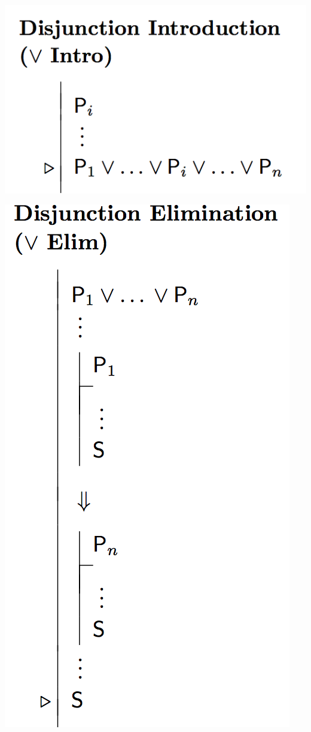\documentclass[12pt]{extarticle}
\begin{document}
\begin{multicols*}{3}
\begin{center}
\includegraphics[scale=0.3]{img/rule_disjunction_intro.png}
\end{center}
\begin{center}
\includegraphics[scale=0.3]{img/rule_disjunction_elim.png}
\end{center}
 

\end{multicols*}
\end{document}
